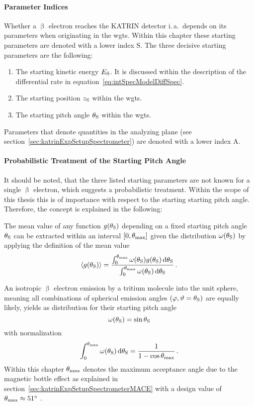 \paragraph{Parameter Indices}
Whether a $\upbeta$ electron reaches the KATRIN detector i.\,a.~depends on its parameters when originating in the \gls{wgts}. Within this chapter these starting parameters are denoted with a lower index $\mathrm{S}$. The three decisive starting parameters are the following:
\begin{enumerate}
	\item The starting kinetic energy $E_\mathrm{S}$. It is discussed within the description of the differential rate in equation~\eqref{eq:intSpecModelDiffSpec}.	
	\item The starting position $z_\mathrm{S}$ within the \gls{wgts}.
	\item The starting pitch angle $\theta_\mathrm{S}$ within the \gls{wgts}.
\end{enumerate}
Parameters that denote quantities in the analyzing plane (see section~\ref{sec:katrinExpSetupSpectrometer}) are denoted with a lower index $\mathrm{A}$.

\paragraph{Probabilistic Treatment of  the Starting Pitch Angle}
It should be noted, that the three listed starting parameters are not known for a single $\upbeta$ electron, which suggests a probabilistic treatment. Within the scope of this thesis this is of importance with respect to the starting starting pitch angle. Therefore, the concept is explained in the following:

The mean value of any function $g(\theta_\mathrm{S})$ depending on a fixed starting pitch angle $\theta_\mathrm{S}$ can be extracted within an interval $[0, \theta_\mathrm{max}]$ given the distribution $\omega(\theta_\mathrm{S})$ by applying the definition of the mean value
\begin{equation}
\label{eq:intSpecModelPitchAngleAveraging}
\left\langle{g(\theta_\mathrm{S})}\right\rangle = 
\frac{
	\int_{0}^{\theta_\mathrm{max}} 
	\omega(\theta_\mathrm{S})
	g(\theta_\mathrm{S})
	\mathop{}\!\mathrm{d} \theta_\mathrm{S}   
}{
	\int_{0}^{\theta_\mathrm{max}} 
	\omega(\theta_\mathrm{S})
	\mathop{}\!\mathrm{d} \theta_\mathrm{S} 
} \text{\,.}
\end{equation}

An isotropic $\upbeta$ electron emission by a tritium molecule into the unit sphere, meaning all combinations of spherical emission angles $(\varphi, \vartheta=\theta_\mathrm{S})$ are equally likely, yields as distribution for their starting pitch angle\cite{Angrik:2005ep}
\begin{equation}
\omega(\theta_\mathrm{S}) = \sin\theta_\mathrm{S}
\end{equation}
with normalization
\begin{equation}
	\int_{0}^{\theta_\mathrm{max}} 
	\omega(\theta_\mathrm{S})
	\mathop{}\!\mathrm{d} \theta_\mathrm{S} = 
	\frac{1}{1-\cos\theta_\mathrm{max}}
	\text{\,.}
\end{equation}
Within this chapter $\theta_\mathrm{max}$ denotes the maximum acceptance angle due to the magnetic bottle effect as explained in section~\ref{sec:katrinExpSetupSpectrometerMACE} with a design value of $\theta_\mathrm{max}\approx\SI{51}{\degree}$ \cite{Angrik:2005ep}.

